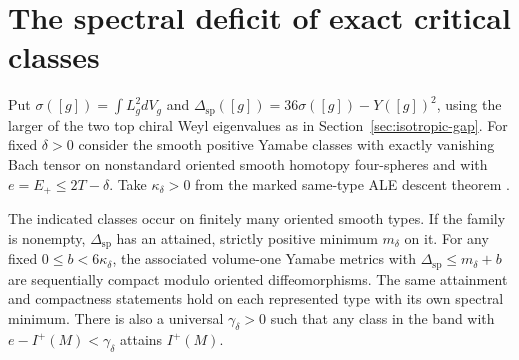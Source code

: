 \section{The spectral deficit of exact critical classes}
\label{sec:exact-spectral-gap}

Put \(\sigma([g])=\int L_g^2dV_g\) and
\(\Delta_{\mathrm{sp}}([g])=36\sigma([g])-Y([g])^2\), using the
larger of the two top chiral Weyl eigenvalues as in
Section~\ref{sec:isotropic-gap}. For fixed \(\delta>0\) consider
the smooth positive Yamabe classes with exactly vanishing Bach
tensor on nonstandard oriented smooth homotopy four-spheres
and with \(e=E_+\le 2T-\delta\). Take
\(\kappa_\delta>0\) from the marked same-type ALE descent theorem
\cite[Same-type descent and Exact compactness]{Baker2026MarkedNecks}.

\begin{theorem}\label{thm:exact-spectral-gap}
The indicated classes occur on finitely many oriented smooth
types. If the family is nonempty, \(\Delta_{\mathrm{sp}}\) has
an attained, strictly positive minimum \(m_\delta\) on it.
For any fixed \(0\le b<6\kappa_\delta\), the associated volume-one
Yamabe metrics with \(\Delta_{\mathrm{sp}}\le m_\delta+b\) are
sequentially compact modulo oriented diffeomorphisms. The same
attainment and compactness statements hold on each represented
type with its own spectral minimum. There is also a universal
\(\gamma_\delta>0\) such that any class in the band with
\(e-I^+(M)<\gamma_\delta\) attains \(I^+(M)\).
\end{theorem}


